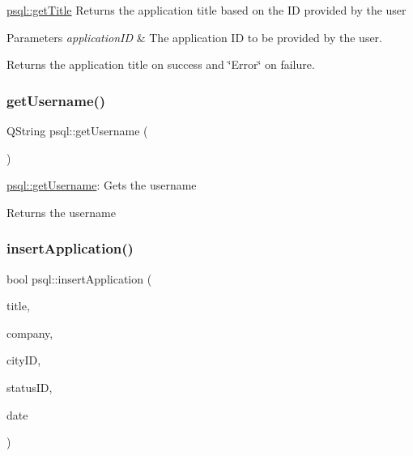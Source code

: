 \hyperlink{classpsql_ada9e3be3e0866011edf53e30ec510afc}{psql\+::get\+Title} Returns the application title based on the ID provided by the user 


\begin{DoxyParams}{Parameters}
{\em application\+ID} & The application ID to be provided by the user. \\
\hline
\end{DoxyParams}
\begin{DoxyReturn}{Returns}
the application title on success and \char`\"{}\+Error\char`\"{} on failure. 
\end{DoxyReturn}
\mbox{\label{classpsql_aecc9fd93dc5ca0c4f4a63d445a36d166}} 
\subsubsection{\texorpdfstring{get\+Username()}{getUsername()}}
{\footnotesize\ttfamily Q\+String psql\+::get\+Username (\begin{DoxyParamCaption}{ }\end{DoxyParamCaption})}



\hyperlink{classpsql_aecc9fd93dc5ca0c4f4a63d445a36d166}{psql\+::get\+Username}\+: Gets the username 

\begin{DoxyReturn}{Returns}
the username 
\end{DoxyReturn}
\mbox{\label{classpsql_a4073d4f70f2ae6211ba0328c2008407c}} 
\subsubsection{\texorpdfstring{insert\+Application()}{insertApplication()}}
{\footnotesize\ttfamily bool psql\+::insert\+Application (\begin{DoxyParamCaption}\item[{Q\+String}]{title,  }\item[{Q\+String}]{company,  }\item[{int}]{city\+ID,  }\item[{int}]{status\+ID,  }\item[{Q\+String}]{date }\end{DoxyParamCaption})}



